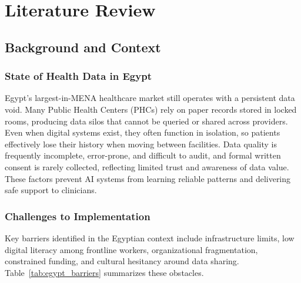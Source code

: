 \chapter{Literature Review}\label{chap:LiteratureReview}

\section{Background and Context}
\subsection{State of Health Data in Egypt}
Egypt's largest-in-MENA healthcare market still operates with a persistent data
void. Many Public Health Centers (PHCs) rely on paper records stored in locked
rooms, producing data silos that cannot be queried or shared across providers.
Even when digital systems exist, they often function in isolation, so patients
effectively lose their history when moving between facilities. Data quality is
frequently incomplete, error-prone, and difficult to audit, and formal written
consent is rarely collected, reflecting limited trust and awareness of data
value. These factors prevent AI systems from learning reliable patterns and
delivering safe support to clinicians.


\subsection{Challenges to Implementation}
Key barriers identified in the Egyptian context include infrastructure limits,
low digital literacy among frontline workers, organizational fragmentation,
constrained funding, and cultural hesitancy around data sharing.
Table~\ref{tab:egypt_barriers} summarizes these obstacles.


